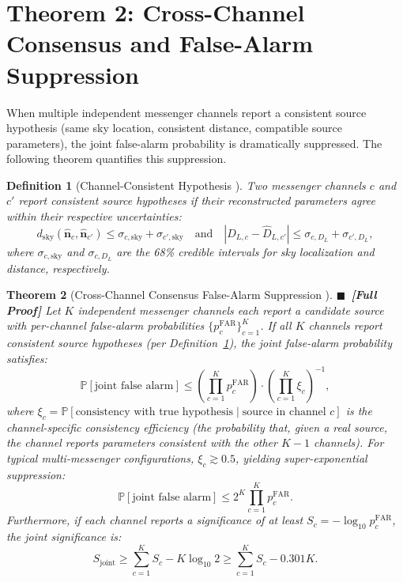 \documentclass[11pt,a4paper]{article}
\newtheorem{theorem}{Theorem}[section]
\newtheorem{definition}[theorem]{Definition}
\theoremstyle{definition}
\newcommand{\rigorFull}[0]{$\blacksquare$~\textbf{[Full Proof]}}
\newcommand{\Pbb}{\mathbb{P}}
\begin{document}
\section{Theorem 2: Cross-Channel Consensus and False-Alarm Suppression}
\label{sec:cross_channel_consensus}
When multiple independent messenger channels report a consistent source hypothesis (same sky location, consistent distance, compatible source parameters), the joint false-alarm probability is dramatically suppressed. The following theorem quantifies this suppression.
\begin{definition}[Channel-Consistent Hypothesis ]\label{def:consistent_hypothesis}
Two messenger channels $c$ and $c'$ report \emph{consistent} source hypotheses if their reconstructed parameters agree within their respective uncertainties:
\begin{equation}\label{eq:consistency}
d_{\mathrm{sky}}(\hat{\mathbf{n}}_c, \hat{\mathbf{n}}_{c'}) \leq \sigma_{c, \mathrm{sky}} + \sigma_{c', \mathrm{sky}} \quad \text{and} \quad |\hat{D}_{L,c} - \hat{D}_{L,c'}| \leq \sigma_{c, D_L} + \sigma_{c', D_L},
\end{equation}
where $\sigma_{c, \mathrm{sky}}$ and $\sigma_{c, D_L}$ are the 68\% credible intervals for sky localization and distance, respectively.
\end{definition}
\begin{theorem}[Cross-Channel Consensus False-Alarm Suppression ]\label{thm:cross_channel_far}
\rigorFull
Let $K$ independent messenger channels each report a candidate source with per-channel false-alarm probabilities $\{p_c^{\mathrm{FAR}}\}_{c=1}^K$. If all $K$ channels report consistent source hypotheses (per Definition~\ref{def:consistent_hypothesis}), the joint false-alarm probability satisfies:
\begin{equation}\label{eq:joint_far}
\Pbb[\text{joint false alarm}] \leq \left(\prod_{c=1}^K p_c^{\mathrm{FAR}}\right) \cdot \left(\prod_{c=1}^K \xi_c\right)^{-1},
\end{equation}
where $\xi_c = \Pbb[\text{consistency with true hypothesis} \mid \text{source in channel } c]$ is the channel-specific consistency efficiency (the probability that, given a real source, the channel reports parameters consistent with the other $K-1$ channels). For typical multi-messenger configurations, $\xi_c \gtrsim 0.5$, yielding super-exponential suppression:
\begin{equation}\label{eq:super_exp_far}
\Pbb[\text{joint false alarm}] \leq 2^K \prod_{c=1}^K p_c^{\mathrm{FAR}}.
\end{equation}
Furthermore, if each channel reports a significance of at least $S_c = -\log_{10} p_c^{\mathrm{FAR}}$, the joint significance is:
\begin{equation}\label{eq:joint_significance}
S_{\mathrm{joint}} \geq \sum_{c=1}^K S_c - K \log_{10} 2 \geq \sum_{c=1}^K S_c - 0.301 K.
\end{equation}
\end{theorem}
\end{document}
